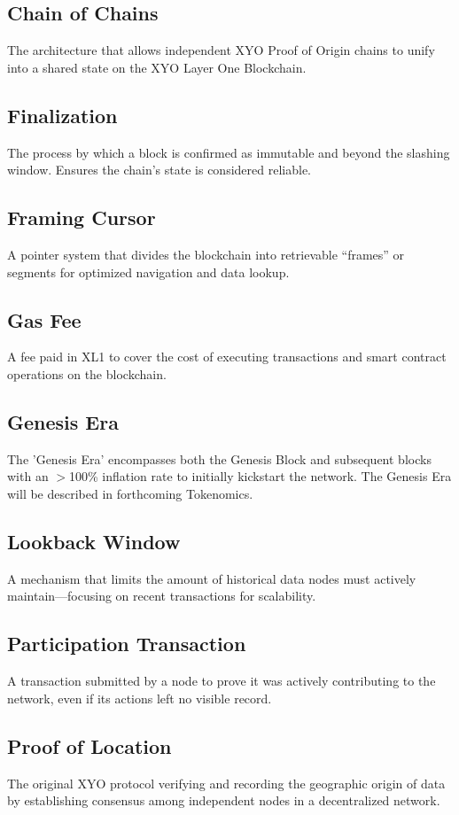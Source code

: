 \documentclass{article}
\begin{document}
\subsection*{Chain of Chains}
The architecture that allows independent XYO Proof of Origin chains to unify into a shared state on the XYO Layer One Blockchain.

\subsection*{Finalization}
The process by which a block is confirmed as immutable and beyond the slashing window. Ensures the chain's state is considered reliable.

\subsection*{Framing Cursor}
A pointer system that divides the blockchain into retrievable “frames” or segments for optimized navigation and data lookup.

\subsection*{Gas Fee}
A fee paid in XL1 to cover the cost of executing transactions and smart contract operations on the blockchain.

\subsection*{Genesis Era}
The 'Genesis Era' encompasses both the Genesis Block and subsequent blocks with an $>$100\% inflation rate to initially kickstart the network. The Genesis Era will be described in forthcoming Tokenomics.

\subsection*{Lookback Window}
A mechanism that limits the amount of historical data nodes must actively maintain—focusing on recent transactions for scalability.

\subsection*{Participation Transaction}
A transaction submitted by a node to prove it was actively contributing to the network, even if its actions left no visible record.

\subsection*{Proof of Location}
The original XYO protocol verifying and recording the geographic origin of data by establishing consensus among independent nodes in a decentralized network.
\end{document}
